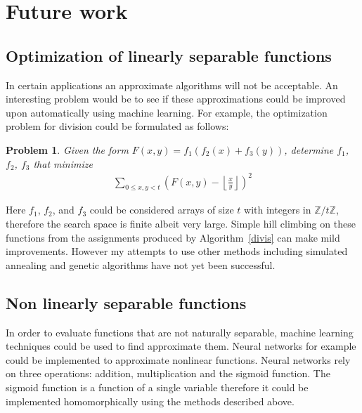 \documentclass{article}
\def\zt{\mathbb{Z}/t\mathbb{Z}}
\newtheorem{prb}{Problem}
\begin{document}
    \section{Future work}
        \subsection{Optimization of linearly separable functions}
          In certain applications an approximate algorithms
          will not be acceptable.
          An interesting problem would be to see if these approximations
          could be improved upon automatically using machine learning.
          For example, the optimization problem for division could be formulated as follows:

          \begin{prb}
            Given the form $F(x,y) = f_1\left( f_2(x) + f_3(y) \right)$, determine $f_1$, $f_2$, $f_3$ that minimize 
            \begin{align}
              \sum_{0\leq x,y<t} \left(F(x,y) 
              - \left\lfloor\frac{x}{y}\right\rfloor\right)^2
            \end{align}
          \end{prb}

          Here $f_1$, $f_2$, and $f_3$ could be considered arrays of size $t$ with integers in $\zt$, 
          therefore the search space is finite albeit very large.
          Simple hill climbing on these functions from the assignments produced by 
          Algorithm~\ref{divis} can make mild improvements.
          However my attempts to use other methods including simulated annealing and genetic algorithms have not yet been successful.
            
        \subsection{Non linearly separable functions}
            In order to evaluate functions that are not naturally separable, 
            machine learning techniques 
            could be used to find approximate them.
            Neural networks for example could be implemented 
            to approximate nonlinear functions.
            Neural networks rely on three operations: 
            addition, multiplication and the sigmoid function.
            The sigmoid function is a function of a single variable 
            therefore it could be implemented homomorphically 
            using the methods described above.
\end{document}
